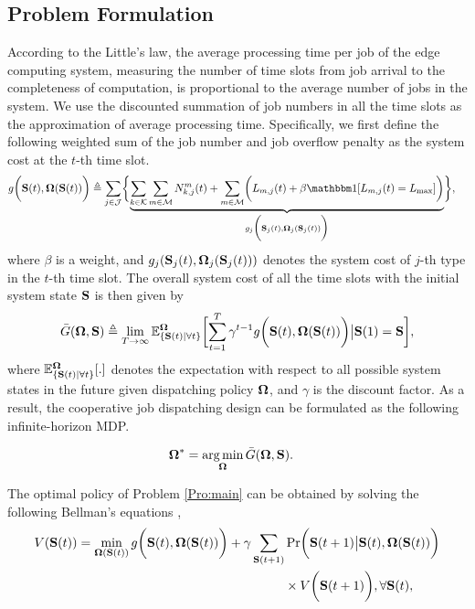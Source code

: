 \subsection{Problem Formulation}
According to the Little's law, the average processing time per job of the edge computing system, measuring the number of time slots from job arrival to the completeness of computation, is proportional to the average number of jobs in the system. We use the discounted summation of job numbers in all the time slots as the approximation of average processing time. Specifically, we first define the following weighted sum of the job number and job overflow penalty as the system cost at the $t$-th time slot.
{\small
\begin{align}
    &g\Paren{ \Stat(t),\Policy(\Stat(t)) }
        \define \sum_{j\in\jSpace} \Brace{
            \underbrace{\sum_{k\in\apSet}\sum_{m\in\esSet}N_{k,j}^m(t) +\sum_{m\in\esSet}\Paren{
                L_{m,j}(t) + \beta \indicator[L_{m,j}(t)=L_{{\max}}]
            }}_{g_j\Paren{ \Stat_j(t),\Policy_j(\Stat_{j}(t)) }}
        },
\end{align}
}
where $\beta$ is a weight, and $g_j(\mathbf{S}_j(t),\boldsymbol{\Omega}_j(\mathbf{S}_{j}(t)))$ denotes the system cost of $j$-th type in the $t$-th time slot. The overall system cost of all the time slots with the initial system state $\mathbf{S}$ is then given by
\begin{align}
    \bar{G}(\Policy, \Stat) \define
    \lim\limits_{T\to\infty} \mathbb{E}_{\{\Stat(t)|\forall t\}}^{\Policy}
    \Bracket{
        \sum_{t=1}^{T} \gamma^{t-1}g\Paren{\Stat(t),\Policy(\Stat(t))} \big|
        \Stat(1)=\Stat
    },
\end{align}
where $\mathbb{E}_{\{\mathbf{S}(t)|\forall t\}}^{\boldsymbol{\Omega}}[.]$ denotes the expectation with respect to all possible system states in the future given dispatching policy $\boldsymbol{\Omega}$, and $\gamma$ is the discount factor. As a result, the cooperative job dispatching design can be formulated as the following infinite-horizon MDP.
\begin{problem}\label{Pro:main} \em
    \begin{align}
            \boldsymbol{\Omega}^*&=\mathop{\arg\min}_{\boldsymbol{\Omega}} \bar{G}(\boldsymbol{\Omega},\mathbf{S}) .
    \end{align}
\end{problem}
The optimal policy of Problem \ref{Pro:main} can be obtained by solving the following Bellman's equations \cite{dp-control},
\begin{align}
    \label{eqn:bellman}
    V(\Stat(t)) = \min_{\Policy(\Stat(t))} g\Paren{ \Stat(t),\Policy(\Stat(t)) }
    +\gamma \sum_{\Stat(t+1)} &\Pr\Paren{ \Stat(t+1)\big|\Stat(t),\Policy(\Stat(t)) }
    \nonumber\\
    &\times V\Paren{ \Stat(t+1) },
    \forall \Stat(t),
\end{align}
